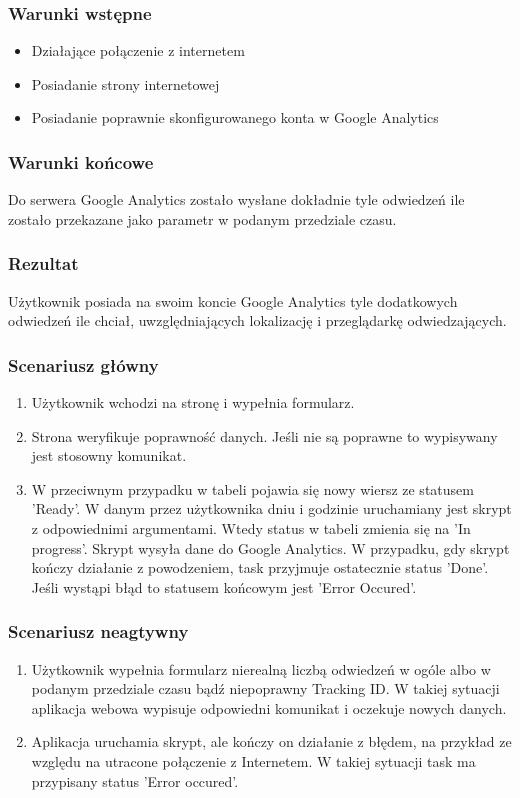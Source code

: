 \documentclass{article}
\begin{document}
\subsubsection{Warunki wstępne}
\begin{itemize}
\item Działające połączenie z internetem
\item Posiadanie strony internetowej
\item Posiadanie poprawnie skonfigurowanego konta w Google Analytics
\end{itemize}

\subsubsection{Warunki końcowe}
Do serwera Google Analytics zostało wysłane dokładnie tyle odwiedzeń ile zostało przekazane jako parametr w podanym przedziale czasu.

\subsubsection{Rezultat}
Użytkownik posiada na swoim koncie Google Analytics tyle dodatkowych odwiedzeń ile chciał, uwzględniających lokalizację i przeglądarkę odwiedzających.

\subsubsection{Scenariusz główny}
\begin{enumerate}
\item Użytkownik wchodzi na stronę i wypełnia formularz.
\item Strona weryfikuje poprawność danych. Jeśli nie są poprawne to wypisywany jest stosowny komunikat.
\item W przeciwnym przypadku w tabeli pojawia się nowy wiersz ze statusem 'Ready'. W danym przez użytkownika dniu i godzinie uruchamiany jest skrypt z odpowiednimi argumentami. Wtedy status  w tabeli zmienia się na 'In progress'. Skrypt wysyła dane do Google Analytics. W przypadku, gdy skrypt kończy działanie z powodzeniem, task przyjmuje ostatecznie status 'Done'. Jeśli wystąpi błąd to statusem końcowym jest 'Error Occured'.
\end{enumerate}

\subsubsection{Scenariusz neagtywny}
\begin{enumerate}

\item Użytkownik wypełnia formularz nierealną liczbą odwiedzeń w ogóle albo w podanym przedziale czasu bądź niepoprawny Tracking ID\@. W takiej sytuacji aplikacja webowa wypisuje odpowiedni komunikat i oczekuje nowych danych.

\item Aplikacja uruchamia skrypt, ale kończy on działanie z błędem, na przykład ze względu na utracone połączenie z Internetem. W takiej sytuacji task ma przypisany status 'Error occured'.


\end{enumerate}
\end{document}
